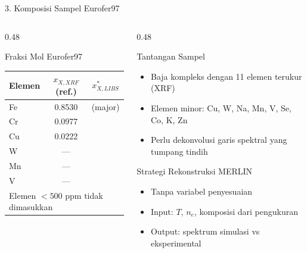 \documentclass[aspectratio=169, 10pt]{beamer}
\begin{document}
\begin{frame}{3. Komposisi Sampel Eurofer97}
  \begin{columns}[T]
    \begin{column}{0.48\textwidth}
      \begin{block}{Fraksi Mol Eurofer97}
        \small
        \begin{tabular}{lcc}
          \toprule
          Elemen & $x_{X,XRF}$ (ref.) & $x^*_{X,LIBS}$ \\
          \midrule
          Fe & 0.8530 & (major) \\
          Cr & 0.0977 & \\
          Cu & 0.0222 & \\
          W  & --- & \\
          Mn & --- & \\
          V  & --- & \\
          \bottomrule
          \multicolumn{3}{l}{\scriptsize Elemen $<500$ ppm tidak dimasukkan}
        \end{tabular}
      \end{block}
    \end{column}
    \begin{column}{0.48\textwidth}
      \begin{alertblock}{Tantangan Sampel}
        \begin{itemize}\small
          \item Baja kompleks dengan 11 elemen terukur (XRF)
          \item Elemen minor: Cu, W, Na, Mn, V, Se, Co, K, Zn
          \item Perlu dekonvolusi garis spektral yang tumpang tindih
        \end{itemize}
      \end{alertblock}
      \vspace{6pt}
      \begin{exampleblock}{Strategi Rekonstruksi MERLIN}
        \begin{itemize}\small
          \item Tanpa variabel penyesuaian
          \item Input: $T$, $n_e$, komposisi dari pengukuran
          \item Output: spektrum simulasi vs eksperimental
        \end{itemize}
      \end{exampleblock}
    \end{column}
  \end{columns}
\end{frame}
\end{document}
